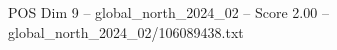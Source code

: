 \begin{textsample}{POS Dim 9 – global\_north\_2024\_02 – Score 2.00 – global\_north\_2024\_02/106089438.txt}
\end{textsample}
